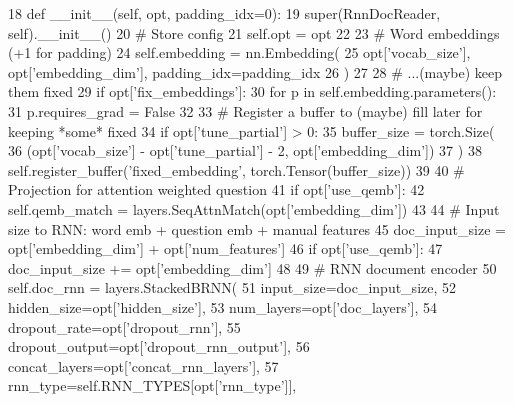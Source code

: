 \begin{DoxyCode}
18     \textcolor{keyword}{def }\_\_init\_\_(self, opt, padding\_idx=0):
19         super(RnnDocReader, self).\_\_init\_\_()
20         \textcolor{comment}{# Store config}
21         self.opt = opt
22 
23         \textcolor{comment}{# Word embeddings (+1 for padding)}
24         self.embedding = nn.Embedding(
25             opt[\textcolor{stringliteral}{'vocab\_size'}], opt[\textcolor{stringliteral}{'embedding\_dim'}], padding\_idx=padding\_idx
26         )
27 
28         \textcolor{comment}{# ...(maybe) keep them fixed}
29         \textcolor{keywordflow}{if} opt[\textcolor{stringliteral}{'fix\_embeddings'}]:
30             \textcolor{keywordflow}{for} p \textcolor{keywordflow}{in} self.embedding.parameters():
31                 p.requires\_grad = \textcolor{keyword}{False}
32 
33         \textcolor{comment}{# Register a buffer to (maybe) fill later for keeping *some* fixed}
34         \textcolor{keywordflow}{if} opt[\textcolor{stringliteral}{'tune\_partial'}] > 0:
35             buffer\_size = torch.Size(
36                 (opt[\textcolor{stringliteral}{'vocab\_size'}] - opt[\textcolor{stringliteral}{'tune\_partial'}] - 2, opt[\textcolor{stringliteral}{'embedding\_dim'}])
37             )
38             self.register\_buffer(\textcolor{stringliteral}{'fixed\_embedding'}, torch.Tensor(buffer\_size))
39 
40         \textcolor{comment}{# Projection for attention weighted question}
41         \textcolor{keywordflow}{if} opt[\textcolor{stringliteral}{'use\_qemb'}]:
42             self.qemb\_match = layers.SeqAttnMatch(opt[\textcolor{stringliteral}{'embedding\_dim'}])
43 
44         \textcolor{comment}{# Input size to RNN: word emb + question emb + manual features}
45         doc\_input\_size = opt[\textcolor{stringliteral}{'embedding\_dim'}] + opt[\textcolor{stringliteral}{'num\_features'}]
46         \textcolor{keywordflow}{if} opt[\textcolor{stringliteral}{'use\_qemb'}]:
47             doc\_input\_size += opt[\textcolor{stringliteral}{'embedding\_dim'}]
48 
49         \textcolor{comment}{# RNN document encoder}
50         self.doc\_rnn = layers.StackedBRNN(
51             input\_size=doc\_input\_size,
52             hidden\_size=opt[\textcolor{stringliteral}{'hidden\_size'}],
53             num\_layers=opt[\textcolor{stringliteral}{'doc\_layers'}],
54             dropout\_rate=opt[\textcolor{stringliteral}{'dropout\_rnn'}],
55             dropout\_output=opt[\textcolor{stringliteral}{'dropout\_rnn\_output'}],
56             concat\_layers=opt[\textcolor{stringliteral}{'concat\_rnn\_layers'}],
57             rnn\_type=self.RNN\_TYPES[opt[\textcolor{stringliteral}{'rnn\_type'}]],

\end{DoxyCode}

